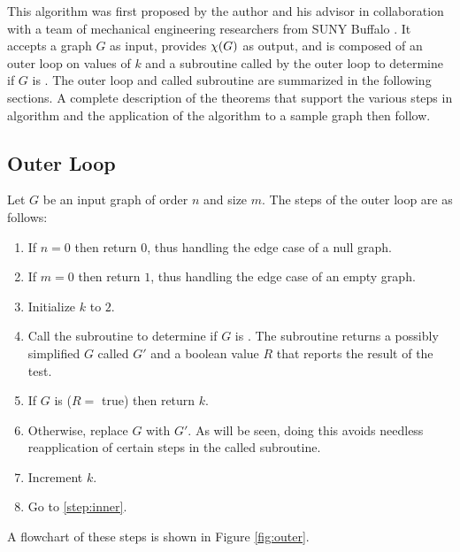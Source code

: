 This algorithm was first proposed by the author and his advisor in collaboration with a team of mechanical
engineering researchers from SUNY Buffalo \cite{cavallaro}.  It accepts a graph \(G\) as input, provides \(\chi(G)\)
as output, and is composed of an outer loop on values of \(k\) and a subroutine called by the outer loop to
determine if \(G\) is .  The outer loop and called subroutine are summarized in the following
sections.  A complete description of the theorems that support the various steps in algorithm and the application
of the algorithm to a sample graph then follow.

\subsection{Outer Loop}

Let \(G\) be an input graph of order \(n\) and size \(m\).  The steps of the outer loop are as follows:

\begin{enumerate}
\item \label{step:null} If \(n=0\) then return \(0\), thus handling the edge case of a null graph.

\item \label{step:one} If \(m=0\) then return \(1\), thus handling the edge case of an empty graph.

\item \label{step:init} Initialize \(k\) to \(2\).

\item \label{step:inner} Call the subroutine to determine if \(G\) is .  The subroutine returns a
  possibly simplified \(G\) called \(G'\) and a boolean value \(R\) that reports the result of the test.

\item \label{step:call} If \(G\) is  (\(R=\) true) then return \(k\).

\item \label{step:newg} Otherwise, replace \(G\) with \(G'\).  As will be seen, doing this avoids needless
  reapplication of certain steps in the called subroutine.

\item \label{step:incr} Increment \(k\).

\item \label{step:loop} Go to \ref{step:inner}.
\end{enumerate}

A flowchart of these steps is shown in Figure \ref{fig:outer}.

